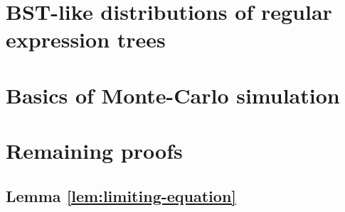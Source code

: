 \begin{example}

\end{example}


\section{BST-like distributions of regular expression trees}


\begin{lemma}
  \label{lem:full-history-sum-asymptotics}
\end{lemma}

\section{Basics of Monte-Carlo simulation}

\section{Remaining proofs}

\subsection{Lemma \ref{lem:limiting-equation}}
\label{subsec:proof-limiting-equation}